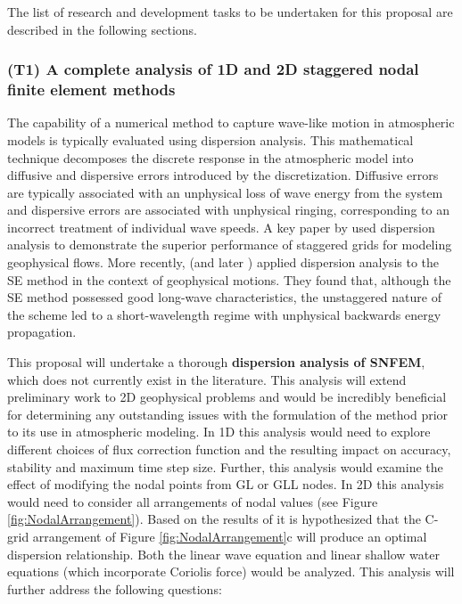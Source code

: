 \documentclass[11pt]{article}
\begin{document}
The list of research and development tasks to be undertaken for this proposal are described in the following sections.

\subsubsection{(T1) A complete analysis of 1D and 2D staggered nodal finite element methods} \label{sec:AnalysisSNFEM}


The capability of a numerical method to capture wave-like motion in atmospheric models is typically evaluated using dispersion analysis.  This mathematical technique decomposes the discrete response in the atmospheric model into diffusive and dispersive errors introduced by the discretization.  Diffusive errors are typically associated with an unphysical loss of wave energy from the system and dispersive errors are associated with unphysical ringing, corresponding to an incorrect treatment of individual wave speeds.  A key paper by \cite{randall1994geostrophic} used dispersion analysis to demonstrate the superior performance of staggered grids for modeling geophysical flows.  More recently, \cite{MAHAW2009SIAMJNA} (and later \cite{melvin2012dispersion}) applied dispersion analysis to the SE method in the context of geophysical motions.  They found that, although the SE method possessed good long-wave characteristics, the unstaggered nature of the scheme led to a short-wavelength regime with unphysical backwards energy propagation.

This proposal will undertake a thorough \textbf{dispersion analysis of SNFEM}, which does not currently exist in the literature.  This analysis will extend preliminary work to 2D geophysical problems and would be incredibly beneficial for determining any outstanding issues with the formulation of the method prior to its use in atmospheric modeling.  In 1D this analysis would need to explore different choices of flux correction function \cite{huynh2007flux} and the resulting impact on accuracy, stability and maximum time step size.  Further, this analysis would examine the effect of modifying the nodal points from GL or GLL nodes.  In 2D this analysis would need to consider all arrangements of nodal values (see Figure \ref{fig:NodalArrangement}).  Based on the results of \cite{randall1994geostrophic} it is hypothesized that the C-grid arrangement of Figure \ref{fig:NodalArrangement}c will produce an optimal dispersion relationship.  Both the linear wave equation and linear shallow water equations (which incorporate Coriolis force) would be analyzed.  This analysis will further address the following questions:
\end{document}
